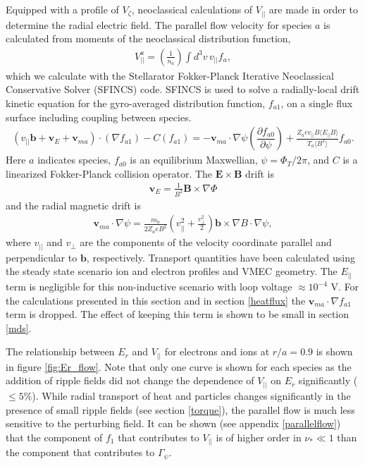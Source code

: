 \documentclass{article}
\numberwithin{figure}{section}
\numberwithin{equation}{section}
\newcommand{\partder}[2]{\dfrac{\partial  #1}{\partial  #2}} %
\begin{document}
Equipped with a profile of $V_{\zeta}$, neoclassical calculations of $V_{||}$ are made in order to determine the radial electric field. The parallel flow velocity for species $a$ is calculated from moments of the neoclassical distribution function,
\begin{gather}
V^a_{||} = \left(\frac{1}{n_a}\right) \int d^3 v \, v_{||} f_a,
\end{gather}
which we calculate with the Stellarator Fokker-Planck Iterative Neoclassical Conservative Solver (SFINCS) \cite{Landreman2014} code.
SFINCS is used to solve a radially-local drift kinetic equation for the gyro-averaged distribution function, $f_{a1}$, on a single flux surface including coupling between species. 
\begin{gather}
( v_{||} \bm{b} + \bm{v}_E + \bm{v}_{ma}) \cdot (\nabla f_{a1})  - C(f_{a1}) = - \bm{v}_{ma} \cdot \nabla \psi \left( \partder{f_{a0}}{\psi} \right) + \frac{Z_a e v_{||} B \langle E_{||} B \rangle}{T_a \langle B^2 \rangle } f_{a0}.
\label{kineticequation}
\end{gather} 
\hspace{-1mm}
Here $a$ indicates species, $f_{a0}$ is an equilibrium Maxwellian, $\psi = \Phi_T/2\pi$, and $C$ is a linearized Fokker-Planck collision operator. The $\bm{E} \times \bm{B}$ drift is 
\begin{gather}
\bm{v}_E = \frac{1}{B^2} \bm{B} \times \nabla \Phi
\end{gather} 
and the radial magnetic drift is
\begin{gather}
\bm{v}_{ma} \cdot \nabla \psi = \frac{m_a }{2Z_a e B^2} \left(v_{||}^2 + \frac{v_{\perp}^2}{2} \right) \bm{b} \times \nabla B \cdot \nabla \psi,
\label{magneticdrift}
\end{gather} 
where $v_{||}$ and $v_{\perp}$ are the components of the velocity coordinate parallel and perpendicular to $\bm{b}$, respectively. Transport quantities have been calculated using the steady state scenario ion and electron profiles and VMEC geometry. The $E_{||}$ term is negligible for this non-inductive scenario with loop voltage $ \approx 10^{-4}$ V. For the calculations presented in this section and in section \ref{heatflux} the $\bm{v}_{ma} \cdot \nabla f_{a1}$ term is dropped. The effect of keeping this term is shown to be small in section \ref{mds}.

The relationship between $E_r$ and $V_{||}$ for electrons and ions at $r/a = 0.9$ is shown in figure \ref{fig:Er_flow}. Note that only one curve is shown for each species as the addition of ripple fields did not change the dependence of $V_{||}$ on $E_r$ significantly ($\leq 5 \%$). While radial transport of heat and particles changes significantly in the presence of small ripple fields (see section \ref{torque}), the parallel flow is much less sensitive to the perturbing field. It can be shown (see appendix \ref{parallelflow}) that the component of $f_1$ that contributes to $V_{||}$ is of higher order in $\nu_* \ll 1 $ than the component that contributes to $\Gamma_{\psi}$. 
\end{document}
